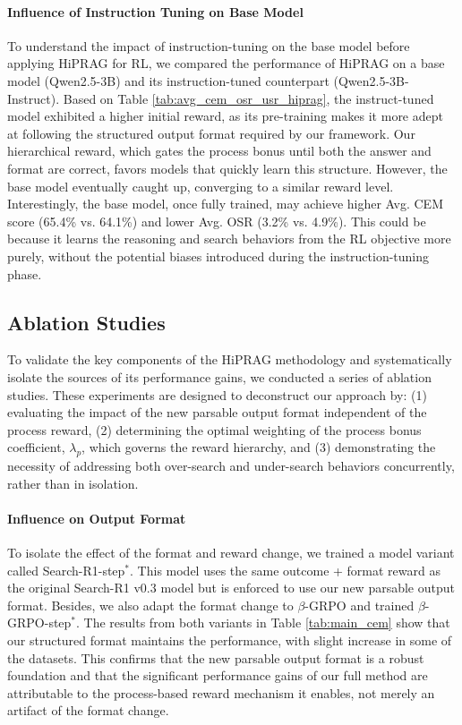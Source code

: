 \documentclass{article}
\begin{document}
\paragraph{Influence of Instruction Tuning on Base Model}
To understand the impact of instruction-tuning on the base model before applying HiPRAG for RL, we compared the performance of HiPRAG on a base model (Qwen2.5-3B) and its instruction-tuned counterpart (Qwen2.5-3B-Instruct). Based on Table \ref{tab:avg_cem_osr_usr_hiprag}, the instruct-tuned model exhibited a higher initial reward, as its pre-training makes it more adept at following the structured output format required by our framework. Our hierarchical reward, which gates the process bonus until both the answer and format are correct, favors models that quickly learn this structure. However, the base model eventually caught up, converging to a similar reward level. Interestingly, the base model, once fully trained, may achieve higher Avg. CEM score (65.4\% vs. 64.1\%) and lower Avg. OSR (3.2\% vs. 4.9\%). This could be because it learns the reasoning and search behaviors from the RL objective more purely, without the potential biases introduced during the instruction-tuning phase.

\subsection{Ablation Studies}
\label{ssec:ablation_studies}
To validate the key components of the HiPRAG methodology and systematically isolate the sources of its performance gains, we conducted a series of ablation studies. These experiments are designed to deconstruct our approach by: (1) evaluating the impact of the new parsable output format independent of the process reward, (2) determining the optimal weighting of the process bonus coefficient, $\lambda_p$, which governs the reward hierarchy, and (3) demonstrating the necessity of addressing both over-search and under-search behaviors concurrently, rather than in isolation.

\paragraph{Influence on Output Format}
To isolate the effect of the format and reward change, we trained a model variant called Search-R1-step$^*$. This model uses the same outcome + format reward as the original Search-R1 v0.3 model but is enforced to use our new parsable output format. Besides, we also adapt the format change to $\beta$-GRPO and trained $\beta$-GRPO-step$^*$. The results from both variants in Table \ref{tab:main_cem} show that our structured format maintains the performance, with slight increase in some of the datasets. This confirms that the new parsable output format is a robust foundation and that the significant performance gains of our full method are attributable to the process-based reward mechanism it enables, not merely an artifact of the format change.
\end{document}

